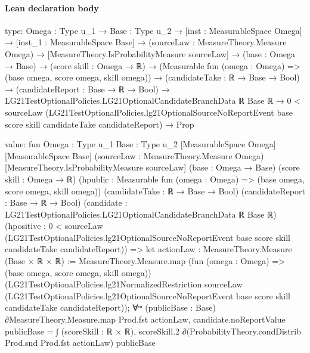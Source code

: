 \documentclass[10pt]{article}
\begin{document}
\paragraph{Lean declaration body}
\begin{ReviewVerbatim}
type:
{Omega : Type u_1} →
  {Base : Type u_2} →
    [inst : MeasurableSpace Omega] →
      [inst_1 : MeasurableSpace Base] →
        (sourceLaw : MeasureTheory.Measure Omega) →
          [MeasureTheory.IsProbabilityMeasure sourceLaw] →
            (base : Omega → Base) →
              (score skill : Omega → ℝ) →
                (Measurable fun (omega : Omega) => (base omega, score omega, skill omega)) →
                  (candidateTake : ℝ → Base → Bool) →
                    (candidateReport : Base → ℝ → Bool) →
                      LG21TestOptionalPolicies.LG21OptionalCandidateBranchData ℝ Base ℝ →
                        0 <
                            sourceLaw
                              (LG21TestOptionalPolicies.lg21OptionalSourceNoReportEvent base score skill candidateTake
                                candidateReport) →
                          Prop

value:
fun {Omega : Type u_1} {Base : Type u_2} [MeasurableSpace Omega] [MeasurableSpace Base]
    (sourceLaw : MeasureTheory.Measure Omega) [MeasureTheory.IsProbabilityMeasure sourceLaw] (base : Omega → Base)
    (score skill : Omega → ℝ) (hpublic : Measurable fun (omega : Omega) => (base omega, score omega, skill omega))
    (candidateTake : ℝ → Base → Bool) (candidateReport : Base → ℝ → Bool)
    (candidate : LG21TestOptionalPolicies.LG21OptionalCandidateBranchData ℝ Base ℝ)
    (hpositive :
      0 <
        sourceLaw
          (LG21TestOptionalPolicies.lg21OptionalSourceNoReportEvent base score skill candidateTake candidateReport)) =>
  let actionLaw : MeasureTheory.Measure (Base × ℝ × ℝ) :=
    MeasureTheory.Measure.map (fun (omega : Omega) => (base omega, score omega, skill omega))
      (LG21TestOptionalPolicies.lg21NormalizedRestriction sourceLaw
        (LG21TestOptionalPolicies.lg21OptionalSourceNoReportEvent base score skill candidateTake candidateReport));
  ∀ᵐ (publicBase : Base) ∂MeasureTheory.Measure.map Prod.fst actionLaw,
    candidate.noReportValue publicBase =
      ∫ (scoreSkill : ℝ × ℝ), scoreSkill.2 ∂(ProbabilityTheory.condDistrib Prod.snd Prod.fst actionLaw) publicBase
\end{ReviewVerbatim}
\end{document}
